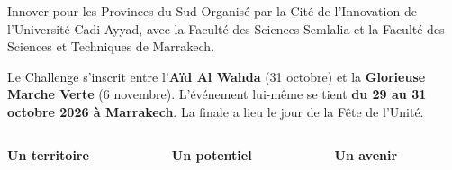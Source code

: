 \documentclass[aspectratio=169,11pt]{beamer}
\newcommand{\card}[2]{%
  \colorbox{cream2}{\parbox[t]{0.94\linewidth}{{\sffamily\scriptsize\bfseries\color{gold}#1}\par\vspace{1mm}{\small #2}}}%
}
\begin{document}
\begin{frame}{Innover pour les Provinces du Sud}
  {\small\color{muted} Organis\'e par la Cit\'e de l'Innovation de l'Universit\'e Cadi Ayyad, avec la Facult\'e des Sciences Semlalia et la Facult\'e des Sciences et Techniques de Marrakech.}\par\vspace{2mm}
  {\small Le Challenge s'inscrit entre l'\textbf{A\"id Al Wahda} (31 octobre) et la \textbf{Glorieuse Marche Verte} (6 novembre). L'\'ev\'enement lui-m\^eme se tient \textbf{du 29 au 31 octobre 2026 \`a Marrakech}. La finale a lieu le jour de la F\^ete de l'Unit\'e.}\par\vspace{2mm}
  \begin{columns}[T]
    \begin{column}{0.32\textwidth}\card{Un territoire}{Les 12 r\'egions du Royaume, de Tanger \`a Lagouira. Trois r\'egions des Provinces du Sud : Guelmim-Oued Noun, La\^ayoune-Sakia El Hamra, Dakhla-Oued Ed-Dahab.}\end{column}
    \begin{column}{0.32\textwidth}\card{Un potentiel}{Port Dakhla Atlantique, \'energies renouvelables, \'economie bleue, agriculture, logistique, tourisme. Une ouverture sur l'Afrique et l'Atlantique.}\end{column}
    \begin{column}{0.32\textwidth}\card{Un avenir}{Connaissance, innovation, entrepreneuriat. Les meilleurs projets entrent dans un programme de maturation d'un an \`a la Cit\'e de l'Innovation.}\end{column}
  \end{columns}
\end{frame}
\end{document}
